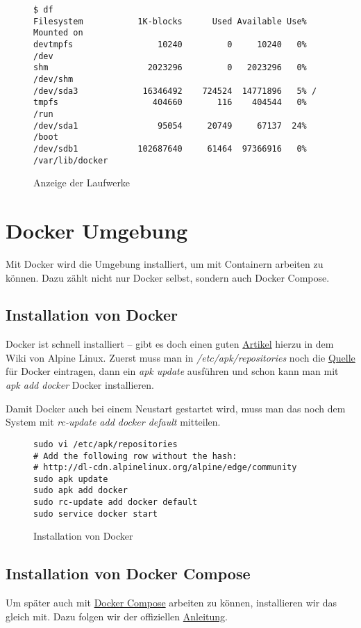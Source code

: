 \documentclass[12pt,a4paper]{article}
\newcommand{\code}[1]{\textit{#1}}
\begin{document}
\begin{figure}[H]
\begin{lstlisting}
$ df
Filesystem           1K-blocks      Used Available Use% Mounted on
devtmpfs                 10240         0     10240   0% /dev
shm                    2023296         0   2023296   0% /dev/shm
/dev/sda3             16346492    724524  14771896   5% /
tmpfs                   404660       116    404544   0% /run
/dev/sda1                95054     20749     67137  24% /boot
/dev/sdb1            102687640     61464  97366916   0% /var/lib/docker
\end{lstlisting}
\caption{Anzeige der Laufwerke}\label{fig:Anzeige der Laufwerke}
\end{figure}

\section{Docker Umgebung}
Mit Docker wird die Umgebung installiert, um mit Containern arbeiten zu können. Dazu zählt nicht nur Docker selbst,
sondern auch Docker Compose.

\subsection{Installation von Docker}
Docker ist schnell installiert -- gibt es doch einen guten \href{https://wiki.alpinelinux.org/wiki/Docker}{Artikel}
hierzu in dem Wiki von Alpine Linux. Zuerst muss man in \code{/etc/apk/repositories} noch die
\href{http://dl-cdn.alpinelinux.org/alpine/latest-stable/community}{Quelle} für Docker eintragen, dann ein \code{apk update}
ausführen und schon kann man mit \code{apk add docker} Docker installieren.

Damit Docker auch bei einem Neustart gestartet wird, muss man das noch dem System mit \code{rc-update add docker default}
mitteilen.

\begin{figure}[H]
\begin{lstlisting}
sudo vi /etc/apk/repositories
# Add the following row without the hash:
# http://dl-cdn.alpinelinux.org/alpine/edge/community
sudo apk update
sudo apk add docker
sudo rc-update add docker default
sudo service docker start
\end{lstlisting}
\caption{Installation von Docker}\label{fig:Installation von Docker}
\end{figure}

\subsection{Installation von Docker Compose}
Um später auch mit \href{https://docs.docker.com/compose/}{Docker Compose} arbeiten zu können, installieren wir das
gleich mit. Dazu folgen wir der offiziellen \href{https://docs.docker.com/compose/install/}{Anleitung}.
\end{document}
